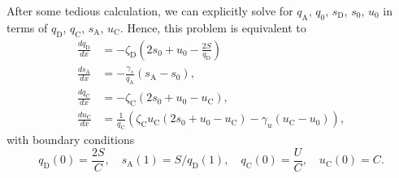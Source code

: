 \documentclass{beamer}
\begin{document}
\begin{frame}
    After some tedious calculation, we can explicitly solve for $q_\mathrm{A}$, $q_0$, $s_\mathrm{D}$, $s_0$, $u_0$ in terms of $q_\mathrm{D}$, $q_\mathrm{C}$, $s_\mathrm{A}$, $u_\mathrm{C}$.
    Hence, this problem is equivalent to
    \begin{align}
        \frac{dq_\mathrm{D}}{dx} &= -\zeta_\mathrm{D}\left( 2s_0+u_0-\frac{2S}{q_\mathrm{D}} \right) \label{eq:sys_q_D}\\
        \frac{ds_\mathrm{A}}{dx} &= -\frac{\gamma_s}{q_\mathrm{A}}(s_\mathrm{A} - s_0),\label{eq:sys_s}\\
        \frac{dq_\mathrm{C}}{dx} &= -\zeta_\mathrm{C}(2s_0+u_0-u_\mathrm{C}),\label{eq:sys_q_C}\\
        \frac{du_\mathrm{C}}{dx} &= \frac{1}{q_\mathrm{C}}\left(\zeta_\mathrm{C}u_\mathrm{C}(2 s_0+u_0 - u_\mathrm{C})- \gamma_u(u_\mathrm{C} - u_0)\right),\label{eq:sys_u}
    \end{align}
        with boundary conditions
    \begin{equation}\label{eq:sys_bdry}
            q_\mathrm{D}(0) = \frac{2S}{C},\quad
            s_\mathrm{A}(1) = S/q_\mathrm{D}(1),\quad
             q_\mathrm{C}(0) = \frac{U}{C},\quad u_\mathrm{C}(0) = C.
    \end{equation}
\end{frame}
\end{document}
